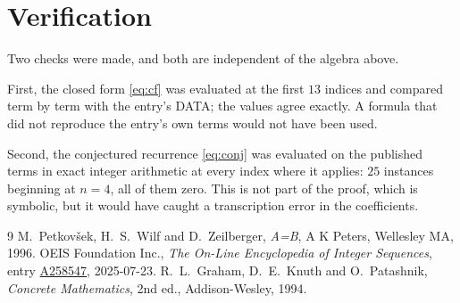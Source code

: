 \documentclass[11pt,a4paper]{article}
\theoremstyle{plain}
\theoremstyle{definition}
\begin{document}
\section{Verification}

Two checks were made, and both are independent of the algebra above.

First, the closed form \eqref{eq:cf} was evaluated at the first $13$ indices and
compared term by term with the entry's DATA; the values agree exactly. A formula that did
not reproduce the entry's own terms would not have been used.

Second, the conjectured recurrence \eqref{eq:conj} was evaluated on the published terms in
exact integer arithmetic at every index where it applies: $25$ instances beginning at
$n=4$, all of them zero. This is not part of the proof, which is symbolic, but it
would have caught a transcription error in the coefficients.

\begin{thebibliography}{9}
 M.~Petkov\v{s}ek, H.~S.~Wilf and D.~Zeilberger, \emph{A=B}, A K Peters,
Wellesley MA, 1996.
 OEIS Foundation Inc., \emph{The On-Line Encyclopedia of Integer Sequences},
entry \href{https://oeis.org/A258547}{A258547}, 2025-07-23.
 R.~L.~Graham, D.~E.~Knuth and O.~Patashnik, \emph{Concrete Mathematics},
2nd ed., Addison-Wesley, 1994.
\end{thebibliography}
\end{document}
